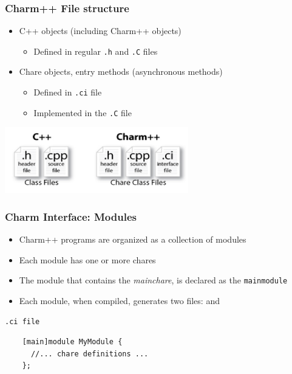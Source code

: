 \begin{frame}
  \frametitle{Charm++ File structure}
  \begin{itemize}
    \item C++ objects (including Charm++ objects)
      \begin{itemize}
      \item Defined in regular \texttt{.h} and \texttt{.C} files
      \end{itemize}
    \item Chare objects, entry methods (asynchronous methods)
      \begin{itemize}
      \item Defined in \texttt{.ci} file
      \item Implemented in the \texttt{.C} file
      \end{itemize}
  \end{itemize}
  \begin{center}
    \includegraphics[width=0.6\textwidth]{figures/charmFiles.png}
  \end{center}
\end{frame}

\begin{frame}[fragile]
  \frametitle{Charm Interface: Modules}
  \begin{itemize}
    \item Charm++ programs are organized as a collection of modules
    \item Each module has one or more chares
    \item The module that contains the \textit{mainchare}, is declared as the
      \texttt{mainmodule}
    \item Each module, when compiled, generates two files:
       and 
  \end{itemize}
  \begin{center}
  \texttt{.ci file}
  \begin{lstlisting}
    [main]module MyModule {
      //... chare definitions ...
    };
  \end{lstlisting}
  \end{center}
\end{frame}

